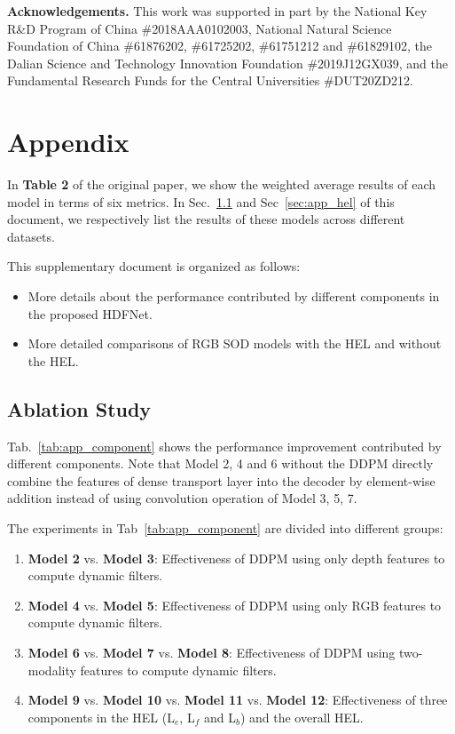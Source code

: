 \documentclass[runningheads]{llncs}
\begin{document}
\noindent\textbf{Acknowledgements.} This work was supported in part by the National Key R\&D Program of China \#2018AAA0102003, National Natural Science Foundation of China \#61876202, \#61725202, \#61751212 and \#61829102, the Dalian Science and Technology Innovation Foundation \#2019J12GX039, and the Fundamental Research Funds for the Central Universities \#DUT20ZD212.

\appendix

\section{Appendix}\label{sec:appendix}

\noindent In \textbf{Table 2} of the original paper, we show the weighted average results of each model in terms of six metrics. In Sec.~\ref{sec:app_component} and Sec~\ref{sec:app_hel} of this document, we respectively list the results of these models across different datasets.

This supplementary document is organized as follows:
\begin{itemize}[noitemsep, nolistsep]
 \item More details about the performance contributed by different components in the proposed HDFNet.
 \item More detailed comparisons of RGB SOD models with the HEL and without the HEL.
\end{itemize}

\subsection{Ablation Study}\label{sec:app_component}

Tab.~\ref{tab:app_component} shows the performance improvement contributed by different components. Note that Model 2, 4 and 6 without the DDPM directly combine the features of dense transport layer into the decoder by element-wise addition instead of using convolution operation of Model 3, 5, 7.

The experiments in Tab~\ref{tab:app_component} are divided into different groups:
\begin{enumerate}
 \item \textbf{Model 2} vs. \textbf{Model 3}: Effectiveness of DDPM using only depth features to compute dynamic filters.
 \item \textbf{Model 4} vs. \textbf{Model 5}: Effectiveness of DDPM using only RGB features to compute dynamic filters.
 \item \textbf{Model 6} vs. \textbf{Model 7} vs. \textbf{Model 8}: Effectiveness of DDPM using two-modality features to compute dynamic filters.
 \item \textbf{Model 9} vs. \textbf{Model 10} vs. \textbf{Model 11} vs. \textbf{Model 12}: Effectiveness of three components in the HEL (L$_{e}$, L$_{f}$ and L$_{b}$) and the overall HEL.
\end{enumerate}
\end{document}
